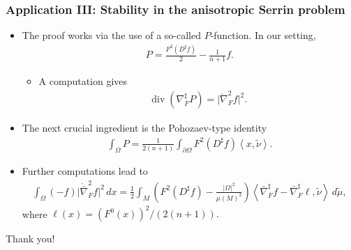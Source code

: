 \documentclass{beamer}
\newcommand{\ti}{\tilde}
\newcommand{\mr}{\mathring}
\newcommand{\8}{\infty}
\newcommand{\Om}{\Omega}
\newcommand{\del}{\partial}
\newcommand{\n}{\nabla}
\newcommand{\ip}[2]{\left\langle #1,#2 \right\rangle}
\newcommand{\fr}[2]{\frac{#1}{#2}}
\DeclareMathOperator{\dive}{div}
\newcommand{\eq}[1]{\begin{equation}\begin{alignedat}{2} #1 \end{alignedat}\end{equation}}
\newcommand{\br}[1]{\left(#1\right)}
\newcommand{\abs}[1]{\lvert #1\rvert}
\begin{document}
\begin{frame} 
\frametitle{Application III: Stability in the anisotropic Serrin problem}

\begin{itemize}
\item The proof works via the use of a so-called $P$-function. In our setting,
\eq{P=\fr{F^{2}(D^{\sharp}f)}{2}-\fr{1}{n+1}f.}
	\begin{itemize}
		\item A computation gives
			\eq{\dive(\n^{\sharp}_{F}P) = \abs{\mr\n^{2}_{F}f}^{2}.}
	\end{itemize}
\item The next crucial ingredient is the Pohozaev-type identity
\eq{\int_{\Om}P = \fr{1}{2(n+1)}\int_{\del\Om}F^{2}(D^{\sharp}f)\ip{x}{\ti \nu}.}
\item Further computations lead to
\eq{\label{eq-integral-identity-OverDetermined}
    \int_\Om (-f)\vert\mathring{\bar\n}_{F}^2f\vert^2\,d x
    =\frac12\int_{M}\br{F^2(D^\sharp f)-\fr{\abs{\Om}^{2}}{\mu(M)^{2}}}\left<\bar\nabla^\sharp_Ff-\bar\nabla^\sharp_F\ell,\tilde\nu\right>\,d\tilde\mu,}
    where $\ell(x) = (F^{0}(x))^{2}/(2(n+1)).$
    \end{itemize}

\end{frame}



























 







\begin{frame}
\begin{center}\Huge Thank you! \end{center}

 \end{frame}

















\end{document}
